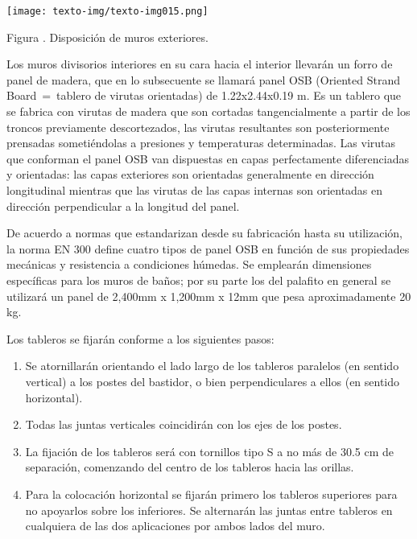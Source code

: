 \documentclass{article}
\newcounter{Figura}
\renewcommand\theFigura{\arabic{Figura}}
\begin{document}
\bigskip

 \texttt{[image: texto-img/texto-img015.png]} 


\bigskip

Figura \stepcounter{Figura}{\theFigura}. Disposición de muros exteriores.


\bigskip


\bigskip

Los muros divisorios interiores en su cara hacia el interior llevarán un forro de panel de madera, que en lo subsecuente se llamará panel OSB (Oriented Strand Board~=~tablero de virutas orientadas) de 1.22x2.44x0.19 m. Es un tablero que se fabrica con virutas de madera que son cortadas tangencialmente a partir de los troncos previamente descortezados, las virutas resultantes son posteriormente prensadas sometiéndolas a presiones y temperaturas determinadas. Las virutas que conforman el panel OSB van dispuestas en capas perfectamente diferenciadas y orientadas: las capas exteriores son orientadas generalmente en dirección longitudinal mientras que las virutas de las capas internas son orientadas en dirección perpendicular a la longitud del panel.


\bigskip

De acuerdo a normas que estandarizan desde su fabricación hasta su utilización, la norma EN 300 define cuatro tipos de panel OSB en función de sus propiedades mecánicas y resistencia a condiciones húmedas. Se emplearán dimensiones específicas para los muros de baños; por su parte los del palafito en general se utilizará un panel de 2,400mm x 1,200mm x 12mm que pesa aproximadamente 20 kg.


\bigskip

Los tableros se fijarán conforme a los siguientes pasos:


\bigskip

\begin{enumerate}
\item Se atornillarán orientando el lado largo de los tableros paralelos (en sentido vertical) a los postes del bastidor, o bien perpendiculares a ellos (en sentido horizontal).
\item Todas las juntas verticales coincidirán con los ejes de los postes.
\item La fijación de los tableros será con tornillos tipo S a no más de 30.5 cm de separación, comenzando del centro de los tableros hacia las orillas.
\item Para la colocación horizontal se fijarán primero los tableros superiores para no apoyarlos sobre los inferiores. Se alternarán las juntas entre tableros en cualquiera de las dos aplicaciones por ambos lados del muro. 
\end{enumerate}
\end{document}
